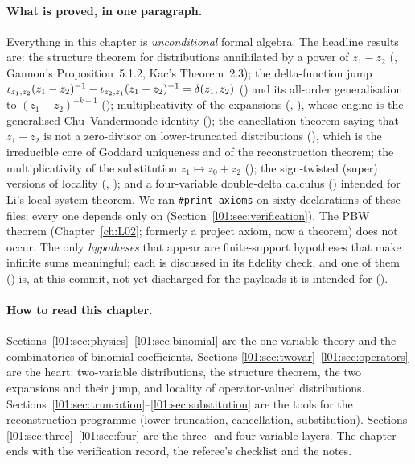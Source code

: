 \paragraph{What is proved, in one paragraph.} Everything in this chapter is
\emph{unconditional} formal algebra. The headline results are:
the structure theorem for distributions annihilated by a power of $z_1-z_2$
(, Gannon's Proposition~5.1.2, Kac's Theorem~2.3);
the delta-function jump $\iota_{z_1,z_2}(z_1-z_2)^{-1}-\iota_{z_2,z_1}(z_1-z_2)^{-1} = \delta(z_1,z_2)$
() and its all-order generalisation to $(z_1-z_2)^{-k-1}$
();
multiplicativity of the expansions (, ), whose
engine is the generalised Chu--Vandermonde identity ();
the cancellation theorem saying that $z_1-z_2$ is not a zero-divisor on lower-truncated
distributions (), which is the irreducible core of
Goddard uniqueness and of the reconstruction theorem;
the multiplicativity of the substitution $z_1\mapsto z_0+z_2$ ();
the sign-twisted (super) versions of locality (,
); and a four-variable double-delta calculus
() intended for Li's
local-system theorem. We ran \texttt{\#print axioms} on sixty declarations of these files; every
one depends only on 
(Section~\ref{l01:sec:verification}). The PBW theorem  (Chapter~\ref{ch:L02}; formerly a project axiom, now a theorem) does not occur. The only
\emph{hypotheses} that appear are finite-support hypotheses that make infinite sums meaningful;
each is discussed in its fidelity check, and one of them () is,
at this commit, not yet discharged for the payloads it is intended for
().

\paragraph{How to read this chapter.} Sections~\ref{l01:sec:physics}--\ref{l01:sec:binomial}
are the one-variable theory and the combinatorics of binomial coefficients. Sections
\ref{l01:sec:twovar}--\ref{l01:sec:operators} are the heart: two-variable distributions, the
structure theorem, the two expansions and their jump, and locality of operator-valued
distributions. Sections~\ref{l01:sec:truncation}--\ref{l01:sec:substitution} are the tools for
the reconstruction programme (lower truncation, cancellation, substitution). Sections
\ref{l01:sec:three}--\ref{l01:sec:four} are the three- and four-variable layers. The chapter ends
with the verification record, the referee's checklist and the notes.

